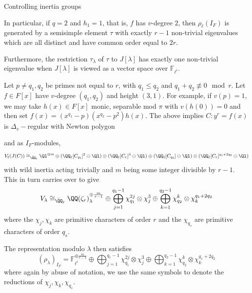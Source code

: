 \documentclass[11pt,a4paper]{article}
\newcommand{\Fli}{\mathbb{F}_{\ell^i}}
\newcommand{\Dv}{\Delta_v}
\newcommand{\Qr}{{\QQ(\zeta_r)}}
\begin{document}
\begin{section}{Controlling inertia groups}
\begin{example}
In particular, if $q=2$ and $h_1 =1$, that is, $f$ has $v$-degree $2$, then $\rho_\ell(I_F)$ is generated by a semisimple element $\tau$ with exactly $r-1$ non-trivial eigenvalues which are all distinct and have common order equal to $2r$.

Furthermore, the restriction $\tau_\lambda$ of $\tau$ to $J[\lambda]$ has exactly one non-trivial eigenvalue when $J[\lambda]$  is viewed as a vector space over $\Fli$.
\end{example}

\begin{example}
\label{example_two_primes}
Let $p \neq q_1,q_2$ be primes not equal to $r$, with $q_1 \leq q_2$ and $q_1+q_2 \not \equiv 0 \mod{r}$. Let $f \in F[x]$ have $v$-degree $(q_1,q_2)$ and height $(3,1)$.
For example, if $v(p)=1$, we may take $h(x) \in F[x]$ monic, separable mod $\pi$ with $v\left( h(0) \right) =0$ and then set $f(x) = (x^{q_1}-p)(x^{q_2}-p^2)h(x)$.  The above implies $C\colon y^r=f(x)$ is $\Dv-$regular with Newton polygon
\begin{center}
\end{center}
 and as $I_F$-modules, \[V_\ell(J(C)) \cong_{\Bar{\QQ}_\ell}\Ql^{\oplus m} \oplus (\QQ_\ell[C_{q_1}]^2 \ominus \Ql)\otimes (\QQ_\ell[C_{r}]^{3}  \ominus \Ql) \oplus (\QQ_\ell[C_{q_2}] \ominus \Ql)\otimes (\QQ_\ell[C_{r}]^{q_1+2q_2}  \ominus \Ql)\]
with wild inertia acting trivially and $m$ being some integer divisible by $r-1$. This in turn carries over to give
\[V_\lambda \cong_{\Bar{\QQ}_\ell} \Qr_{\lambda}^{\oplus \frac{m}{r-1}} \oplus \bigoplus_{j=1}^{q_1-1} \chi_{q_1}^{2j} \otimes \chi_j^{3} \oplus \bigoplus_{k=1}^{q_2-1} \chi_{q_2}^{k} \otimes \chi_k^{q_1+2q_2}\]
where the $\chi_j, \chi_k$ are primitive characters of order $r$ and the $\chi_{q_s}$ are primitive characters of order $q_s$.

The representation modulo $\lambda$ then satisfies
\[ (\rho_\lambda)_{I_F} = \Fli^{\oplus \frac{m}{r-1}} \oplus \bigoplus_{j=1}^{q_1-1} \chi_{q_1}^{2j} \otimes \chi_j^{3} \oplus \bigoplus_{k=1}^{q_2-1} \chi_{q_2}^{k} \otimes \chi_k^{q_1+2q_2}
\]
where again by abuse of notation, we use the same symbols to denote the reductions of $\chi_{j},\chi_k, \chi_{q_s}$.
\end{example}




\end{section}
\end{document}
